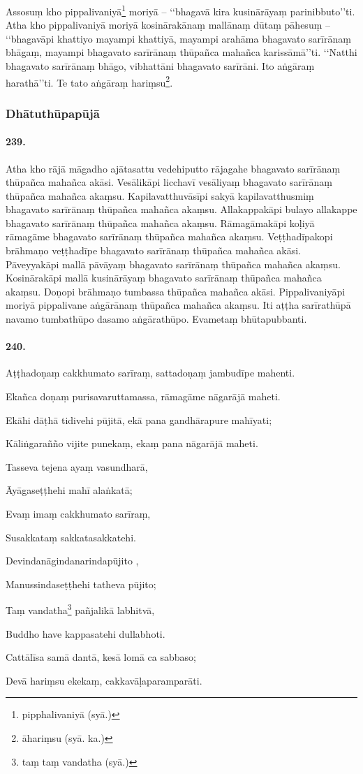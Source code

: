 Assosuṃ kho pippalivaniyā\footnote{pipphalivaniyā (syā.)} moriyā – ‘‘bhagavā kira kusinārāyaṃ parinibbuto’’ti. Atha kho pippalivaniyā moriyā kosinārakānaṃ mallānaṃ dūtaṃ pāhesuṃ – ‘‘bhagavāpi khattiyo mayampi khattiyā, mayampi arahāma bhagavato sarīrānaṃ bhāgaṃ, mayampi bhagavato sarīrānaṃ thūpañca mahañca karissāmā’’ti. ‘‘Natthi bhagavato sarīrānaṃ bhāgo, vibhattāni bhagavato sarīrāni. Ito aṅgāraṃ harathā’’ti. Te tato aṅgāraṃ hariṃsu\footnote{āhariṃsu (syā. ka.)}.

\subsubsection{Dhātuthūpapūjā}

\paragraph{239.} Atha kho rājā māgadho ajātasattu vedehiputto rājagahe bhagavato sarīrānaṃ thūpañca mahañca akāsi. Vesālikāpi licchavī vesāliyaṃ bhagavato sarīrānaṃ thūpañca mahañca akaṃsu. Kapilavatthuvāsīpi sakyā kapilavatthusmiṃ bhagavato sarīrānaṃ thūpañca mahañca akaṃsu. Allakappakāpi bulayo allakappe bhagavato sarīrānaṃ thūpañca mahañca akaṃsu. Rāmagāmakāpi koḷiyā rāmagāme bhagavato sarīrānaṃ thūpañca mahañca akaṃsu. Veṭṭhadīpakopi brāhmaṇo veṭṭhadīpe bhagavato sarīrānaṃ thūpañca mahañca akāsi. Pāveyyakāpi mallā pāvāyaṃ bhagavato sarīrānaṃ thūpañca mahañca akaṃsu. Kosinārakāpi mallā kusinārāyaṃ bhagavato sarīrānaṃ thūpañca mahañca akaṃsu. Doṇopi brāhmaṇo tumbassa thūpañca mahañca akāsi. Pippalivaniyāpi moriyā pippalivane aṅgārānaṃ thūpañca mahañca akaṃsu. Iti aṭṭha sarīrathūpā navamo tumbathūpo dasamo aṅgārathūpo. Evametaṃ bhūtapubbanti.

\paragraph{240.} Aṭṭhadoṇaṃ cakkhumato sarīraṃ, sattadoṇaṃ jambudīpe mahenti.

Ekañca doṇaṃ purisavaruttamassa, rāmagāme nāgarājā maheti.

Ekāhi dāṭhā tidivehi pūjitā, ekā pana gandhārapure mahīyati;

Kāliṅgarañño vijite punekaṃ, ekaṃ pana nāgarājā maheti.

Tasseva tejena ayaṃ vasundharā,

Āyāgaseṭṭhehi mahī alaṅkatā;

Evaṃ imaṃ cakkhumato sarīraṃ,

Susakkataṃ sakkatasakkatehi.

Devindanāgindanarindapūjito ,

Manussindaseṭṭhehi tatheva pūjito;

Taṃ vandatha\footnote{taṃ taṃ vandatha (syā.)} pañjalikā labhitvā,

Buddho have kappasatehi dullabhoti.

Cattālīsa samā dantā, kesā lomā ca sabbaso;

Devā hariṃsu ekekaṃ, cakkavāḷaparamparāti.

